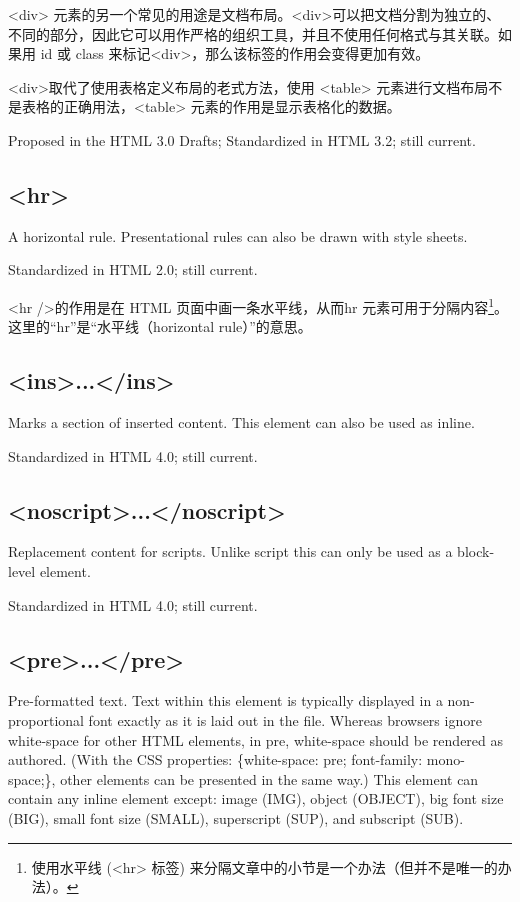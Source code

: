 <div> 元素的另一个常见的用途是文档布局。<div>可以把文档分割为独立的、不同的部分，因此它可以用作严格的组织工具，并且不使用任何格式与其关联。如果用 id 或 class 来标记<div>，那么该标签的作用会变得更加有效。

<div>取代了使用表格定义布局的老式方法，使用 <table> 元素进行文档布局不是表格的正确用法，<table> 元素的作用是显示表格化的数据。


Proposed in the HTML 3.0 Drafts; Standardized in HTML 3.2; still current.




\subsection{<hr>}


A horizontal rule. Presentational rules can also be drawn with style sheets.

Standardized in HTML 2.0; still current.

<hr />的作用是在 HTML 页面中画一条水平线，从而hr 元素可用于分隔内容\footnote{使用水平线 (<hr> 标签) 来分隔文章中的小节是一个办法（但并不是唯一的办法）。}。这里的“hr”是“水平线（horizontal rule）”的意思。



\subsection{<ins>...</ins>}


Marks a section of inserted content. This element can also be used as inline.

Standardized in HTML 4.0; still current.



\subsection{<noscript>...</noscript>}

Replacement content for scripts. Unlike script this can only be used as a block-level element.

Standardized in HTML 4.0; still current.





\subsection{<pre>...</pre>}


Pre-formatted text. Text within this element is typically displayed in a non-proportional font exactly as it is laid out in the file. Whereas browsers ignore white-space for other HTML elements, in pre, white-space should be rendered as authored. (With the CSS properties: \{white-space: pre; font-family: mono-space;\}, other elements can be presented in the same way.) This element can contain any inline element except: image (IMG), object (OBJECT), big font size (BIG), small font size (SMALL), superscript (SUP), and subscript (SUB).

